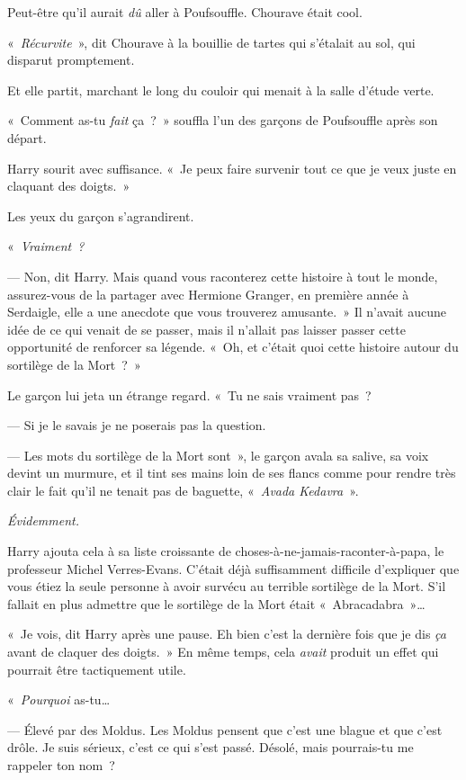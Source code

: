 Peut-être qu'il aurait \emph{dû} aller à Poufsouffle.
Chourave était cool.

«~\emph{Récurvite}~», dit Chourave à la bouillie de tartes qui s'étalait au sol, qui disparut promptement.

Et elle partit, marchant le long du couloir qui menait à la salle d'étude verte.

«~Comment as-tu \emph{fait} ça~?~» souffla l'un des garçons de Poufsouffle après son départ.

Harry sourit avec suffisance.
«~Je peux faire survenir tout ce que je veux juste en claquant des doigts.~»

Les yeux du garçon s'agrandirent.

«~\emph{Vraiment~?}

--- Non, dit Harry. Mais quand vous raconterez cette histoire à tout le monde, assurez-vous de la partager avec Hermione Granger, en première année à Serdaigle, elle a une anecdote que vous trouverez amusante.~»
Il n'avait aucune idée de ce qui venait de se passer, mais il n'allait pas laisser passer cette opportunité de renforcer sa légende.
«~Oh, et c'était quoi cette histoire autour du sortilège de la Mort~?~»

Le garçon lui jeta un étrange regard.
«~Tu ne sais vraiment pas~?

--- Si je le savais je ne poserais pas la question.

--- Les mots du sortilège de la Mort sont~», le garçon avala sa salive, sa voix devint un murmure, et il tint ses mains loin de ses flancs comme pour rendre très clair le fait qu'il ne tenait pas de baguette, «~\emph{Avada Kedavra}~».

\emph{Évidemment.}

Harry ajouta cela à sa liste croissante de choses-à-ne-jamais-raconter-à-papa, le professeur Michel Verres-Evans.
C'était déjà suffisamment difficile d'expliquer que vous étiez la seule personne à avoir survécu au terrible sortilège de la Mort.
S'il fallait en plus admettre que le sortilège de la Mort était «~Abracadabra~»…

«~Je vois, dit Harry après une pause.
Eh bien c'est la dernière fois que je dis \emph{ça} avant de claquer des doigts.~»
En même temps, cela \emph{avait} produit un effet qui pourrait être tactiquement utile.

«~\emph{Pourquoi} as-tu…

--- Élevé par des Moldus.
Les Moldus pensent que c'est une blague et que c'est drôle.
Je suis sérieux, c'est ce qui s'est passé.
Désolé, mais pourrais-tu me rappeler ton nom~?

